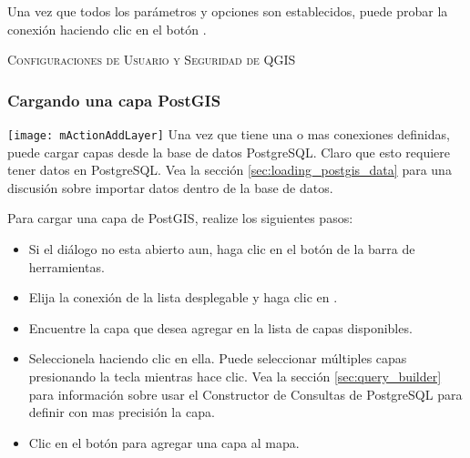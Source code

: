 Una vez que todos los par\'ametros y opciones son establecidos, puede probar la conexi\'on haciendo clic 
en el bot\'on  .

\begin{Tip}\caption{\textsc{Configuraciones de Usuario y Seguridad de QGIS}}
\end{Tip}

\subsubsection{Cargando una capa PostGIS}

\texttt{[image: mActionAddLayer]} Una vez que tiene una o mas
conexiones definidas, puede cargar capas desde la base de datos PostgreSQL. Claro
que esto requiere tener datos en PostgreSQL. Vea la secci\'on
\ref{sec:loading_postgis_data} para una discusi\'on sobre importar datos dentro de la
base de datos. 

Para cargar una capa de PostGIS, realize los siguientes pasos:

\begin{itemize}
\item Si el di\'alogo  no esta abierto aun, haga clic en el bot\'on
de la barra de herramientas.
\item Elija la conexi\'on de la lista desplegable y haga clic en .
\item Encuentre la capa que desea agregar en la lista de capas disponibles.
\item Seleccionela haciendo clic en ella. Puede seleccionar m\'ultiples capas presionando
la tecla  mientras hace clic. Vea la secci\'on \ref{sec:query_builder} para
informaci\'on sobre usar el Constructor de Consultas de PostgreSQL para definir con mas precisi\'on la capa.
\item Clic en el bot\'on  para agregar una capa al mapa.
\end{itemize}

